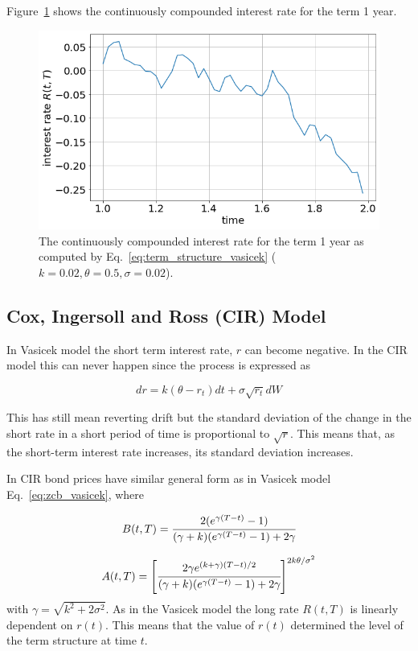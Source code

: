 Figure~\ref{fig:term_structure_vasicek} shows the continuously compounded interest rate for the term 1 year.

\begin{figure}[htb]
	\centering
	\includegraphics[width=0.7\linewidth]{figures/vasicek_interest_rate}
	\caption{The continuously compounded interest rate for the term 1 year as computed by Eq.~\ref{eq:term_structure_vasicek} ($k=0.02, \theta=0.5, \sigma=0.02$).}
	\label{fig:term_structure_vasicek}
\end{figure}

\subsection{Cox, Ingersoll and Ross (CIR) Model}
\label{cox-ingersoll-and-ross-cir-model}

In Vasicek model the short term interest rate, \(r\) can become negative. In the CIR model this can never happen since the process is expressed as

\begin{equation}
dr = k(\theta - r_t)dt + \sigma\sqrt{r_t}dW
\label{eq:cir_process}
\end{equation}

This has still mean reverting drift but the standard deviation of the change in the short rate in a short period of time is proportional to \(\sqrt{r}\). This means that, as the short-term interest rate increases, its standard deviation increases.

In CIR bond prices have similar general form as in Vasicek model Eq.~\ref{eq:zcb_vasicek}, where

\begin{equation}
B(t, T) = \cfrac{2(e^{\gamma(T-t)}-1)}{(\gamma+k)(e^{\gamma(T-t)}-1)+2\gamma}
\label{eq:cir_B_param}
\end{equation}

\begin{equation}
A(t, T) = \left[\cfrac{2\gamma e^{(k+\gamma)(T-t)/2}}{(\gamma+k)(e^{\gamma(T-t)}-1)+2\gamma}\right]^{2k\theta /\sigma^2}
\label{eq:cir_A_param}
\end{equation}
with \(\gamma = \sqrt {k^2 + 2\sigma^2}\). As in the Vasicek model the long rate \(R(t, T)\) is linearly dependent on \(r(t)\). This means that the value of \(r(t)\) determined the level of the term structure at time \(t\).

